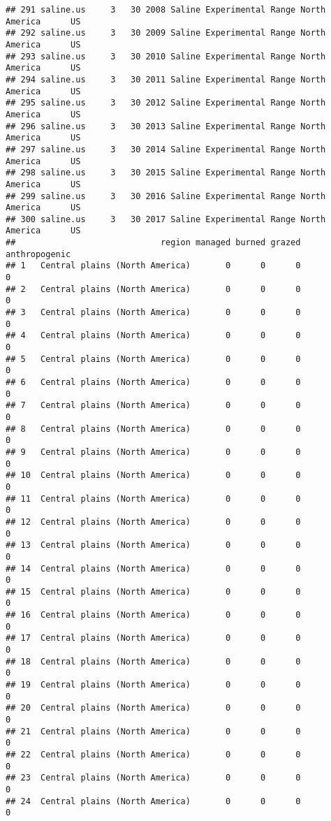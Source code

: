 \documentclass[]{article}
\begin{document}
\begin{verbatim}
## 291 saline.us     3   30 2008 Saline Experimental Range North America      US
## 292 saline.us     3   30 2009 Saline Experimental Range North America      US
## 293 saline.us     3   30 2010 Saline Experimental Range North America      US
## 294 saline.us     3   30 2011 Saline Experimental Range North America      US
## 295 saline.us     3   30 2012 Saline Experimental Range North America      US
## 296 saline.us     3   30 2013 Saline Experimental Range North America      US
## 297 saline.us     3   30 2014 Saline Experimental Range North America      US
## 298 saline.us     3   30 2015 Saline Experimental Range North America      US
## 299 saline.us     3   30 2016 Saline Experimental Range North America      US
## 300 saline.us     3   30 2017 Saline Experimental Range North America      US
##                             region managed burned grazed anthropogenic
## 1   Central plains (North America)       0      0      0             0
## 2   Central plains (North America)       0      0      0             0
## 3   Central plains (North America)       0      0      0             0
## 4   Central plains (North America)       0      0      0             0
## 5   Central plains (North America)       0      0      0             0
## 6   Central plains (North America)       0      0      0             0
## 7   Central plains (North America)       0      0      0             0
## 8   Central plains (North America)       0      0      0             0
## 9   Central plains (North America)       0      0      0             0
## 10  Central plains (North America)       0      0      0             0
## 11  Central plains (North America)       0      0      0             0
## 12  Central plains (North America)       0      0      0             0
## 13  Central plains (North America)       0      0      0             0
## 14  Central plains (North America)       0      0      0             0
## 15  Central plains (North America)       0      0      0             0
## 16  Central plains (North America)       0      0      0             0
## 17  Central plains (North America)       0      0      0             0
## 18  Central plains (North America)       0      0      0             0
## 19  Central plains (North America)       0      0      0             0
## 20  Central plains (North America)       0      0      0             0
## 21  Central plains (North America)       0      0      0             0
## 22  Central plains (North America)       0      0      0             0
## 23  Central plains (North America)       0      0      0             0
## 24  Central plains (North America)       0      0      0             0

\end{verbatim}
\end{document}
